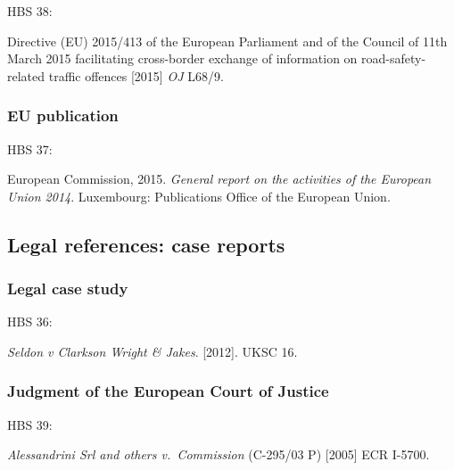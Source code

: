 HBS 38: \cite{eu.dir2015/413}

Directive (EU) 2015/413 of the European Parliament and of the Council of 11th March 2015 facilitating cross-border exchange of information on road-safety-related traffic offences [2015] \emph{OJ} L68/9.




\subsubsection*{EU publication}

HBS 37: \cite{ec2015gra}

European Commission, 2015. \emph{General report on the activities of the European Union 2014}. Luxembourg: Publications Office of the European Union.



\subsection{Legal references: case reports}

\subsubsection*{Legal case study}

HBS 36: \cite{seldon-v-c.w.j2012}

\emph{Seldon v Clarkson Wright \& Jakes}. [2012]. UKSC 16.



\subsubsection*{Judgment of the European Court of Justice}

HBS 39: \cite{srl.etal-v-comm2005}

\emph{Alessandrini Srl and others v.~Commission} (C-295/03 P) [2005] ECR I-5700.


